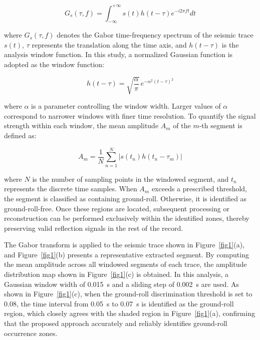 \documentclass[alpha-refs]{wiley-article}
\begin{document}
\begin{equation}
    G_s(\tau, f) = \int_{-\infty}^{+\infty} s(t) h(t - \tau) e^{-i2\pi ft} dt
\end{equation}

where $G_s(\tau, f)$ denotes the Gabor time-frequency spectrum of the seismic trace $s(t)$, 
$\tau$ represents the translation along the time axis, and $h(t - \tau)$ is the analysis window 
function. In this study, a normalized Gaussian function is adopted as the window function:

\begin{equation}
    h(t - \tau) = \sqrt{\frac{\alpha}{\pi}} \, e^{-\alpha^2(t-\tau)^2}
\end{equation}

where $\alpha$ is a parameter controlling the window width. Larger values of $\alpha$ 
correspond to narrower windows with finer time resolution. To quantify the signal strength within each window, the mean 
amplitude $A_m$ of the $m$-th segment is defined as:

\begin{equation}
    A_m = \frac{1}{N} \sum_{n=1}^{N} \left| s(t_n) h(t_n - \tau_m) \right|
\end{equation}

where $N$ is the number of sampling points in the windowed segment, and $t_n$ represents the 
discrete time samples. When $A_m$ exceeds a 
prescribed threshold, the segment is classified as containing ground-roll. Otherwise, it is 
identified as ground-roll-free. Once these regions are located, subsequent processing or 
reconstruction can be performed exclusively within the identified zones, thereby preserving 
valid reflection signals in the rest of the record.

The Gabor transform is applied to the seismic trace shown in Figure~\ref{fig1}(a), and 
Figure~\ref{fig1}(b) presents a representative extracted segment. By computing the mean 
amplitude across all windowed segments of each trace, the amplitude distribution map 
shown in Figure~\ref{fig1}(c) is obtained. In this analysis, a Gaussian window width of 
\SI{0.015}{\second} and a sliding step of \SI{0.002}{\second} are used. As shown in 
Figure~\ref{fig1}(c), when the ground-roll discrimination threshold is set to 0.08, 
the time interval from \SI{0.05}{\second} to \SI{0.07}{\second} is identified as the 
ground-roll region, which closely agrees with the shaded region in Figure~\ref{fig1}(a), 
confirming that the proposed approach accurately and reliably identifies ground-roll 
occurrence zones.
\end{document}
